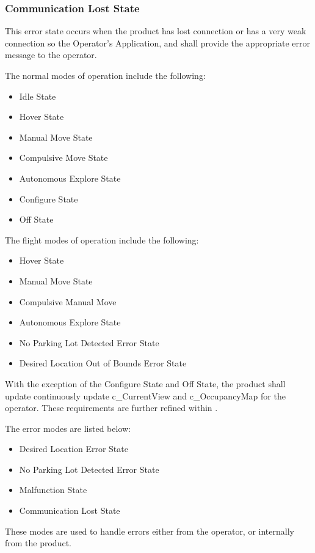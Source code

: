 \documentclass{article}
\begin{document}
\subsubsection{Communication Lost State}
\label{Communication Lost State}
This error state occurs when the product has lost connection or has a very weak connection so the Operator's Application, and shall provide the appropriate error message to the operator.


The normal modes of operation include the following:
\begin{itemize}
  \item Idle State
  \item Hover State
  \item Manual Move State
  \item Compulsive Move State
  \item Autonomous Explore State
  \item Configure State
  \item Off State
\end{itemize}
The flight modes of operation \label{flightModes} include the following:
\begin{itemize}
  \item Hover State
  \item Manual Move State
  \item Compulsive Manual Move
  \item Autonomous Explore State
   \item No Parking Lot Detected Error State
   \item Desired Location Out of Bounds Error State
\end{itemize}
With the exception of the Configure State and Off State, the product shall update continuously update c_CurrentView and c_OccupancyMap for the operator. These requirements are further refined within . 

The error modes are listed below:
\begin{itemize}
    \item Desired Location Error State
    \item No Parking Lot Detected Error State
    \item Malfunction State
    \item Communication Lost State
\end{itemize}
These modes are used to handle errors either from the operator, or internally from the product. 
\end{document}
